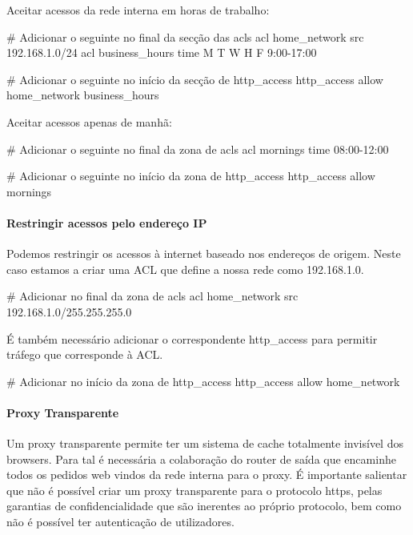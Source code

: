 Aceitar acessos da rede interna em horas de trabalho:

\begin{Output}
# Adicionar o seguinte no final da secção das acls
acl home_network src 192.168.1.0/24
acl business_hours time M T W H F 9:00-17:00

# Adicionar o seguinte no início da secção de http_access
http\_access allow home_network business_hours
\end{Output}

Aceitar acessos apenas de manhã:

\begin{Output}
# Adicionar o seguinte no final da zona de acls
acl mornings time 08:00-12:00

# Adicionar o seguinte no início da zona de http_access
http\_access allow mornings
\end{Output}

\paragraph{Restringir acessos pelo endereço IP}

Podemos restringir os acessos à internet baseado nos endereços de
origem.
Neste caso estamos a criar uma ACL que define a nossa rede como
192.168.1.0.

\begin{Output}
# Adicionar no final da zona de acls
acl home_network src 192.168.1.0/255.255.255.0
\end{Output}

É também necessário adicionar o correspondente http\_access para
permitir tráfego que corresponde à ACL.

\begin{Output}
# Adicionar no início da zona de http_access
http_access allow home_network
\end{Output}

\paragraph{Proxy Transparente}

Um proxy transparente permite ter um sistema de cache totalmente
invisível dos browsers.
Para tal é necessária a colaboração do router de saída que
encaminhe todos os pedidos web vindos da rede interna para o proxy.
É importante salientar que não é possível criar um proxy
transparente para o protocolo https, pelas garantias de
confidencialidade que são inerentes ao próprio protocolo, bem como
não é possível ter autenticação de utilizadores.

